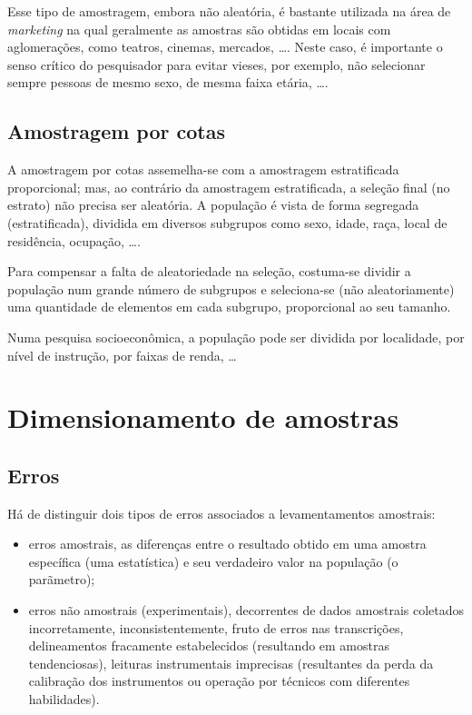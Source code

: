 \documentclass[
]{book}
\providecommand{\tightlist}{%
  \setlength{\itemsep}{0pt}\setlength{\parskip}{0pt}}
\begin{document}
Esse tipo de amostragem, embora não aleatória, é bastante utilizada na área de \emph{marketing} na qual geralmente as amostras são obtidas em locais com aglomerações, como teatros, cinemas, mercados, \ldots. Neste caso, é importante o senso crítico do pesquisador para evitar vieses, por exemplo, não selecionar sempre pessoas de mesmo sexo, de mesma faixa etária, \ldots.

\hypertarget{amostragem-por-cotas}{%
\subsection{Amostragem por cotas}\label{amostragem-por-cotas}}

\hfill\break

A amostragem por cotas assemelha-se com a amostragem estratificada proporcional; mas, ao contrário da amostragem estratificada, a seleção final (no estrato) não precisa ser aleatória. A população é vista de forma segregada (estratificada), dividida em diversos subgrupos como sexo, idade, raça, local de residência, ocupação, \ldots.

\hfill\break

Para compensar a falta de aleatoriedade na seleção, costuma-se dividir a população num grande número de subgrupos e seleciona-se (não aleatoriamente) uma quantidade de elementos em cada subgrupo, proporcional ao seu tamanho.

\hfill\break

Numa pesquisa socioeconômica, a população pode ser dividida por localidade, por nível de instrução, por faixas de renda, \ldots{}

\hfill\break

\hypertarget{dimensionamento-de-amostras}{%
\section{Dimensionamento de amostras}\label{dimensionamento-de-amostras}}

\hypertarget{erros}{%
\subsection{Erros}\label{erros}}

\hfill\break

Há de distinguir dois tipos de erros associados a levamentamentos amostrais:

\hfill\break

\begin{itemize}
\tightlist
\item
  erros amostrais, as diferenças entre o resultado obtido em uma amostra específica (uma estatística) e seu verdadeiro valor na população (o parãmetro);\\
\item
  erros não amostrais (experimentais), decorrentes de dados amostrais coletados incorretamente, inconsistentemente, fruto de erros nas transcrições, delineamentos fracamente estabelecidos (resultando em amostras tendenciosas), leituras instrumentais imprecisas (resultantes da perda da calibração dos instrumentos ou operação por técnicos com diferentes habilidades).
\end{itemize}
\end{document}
